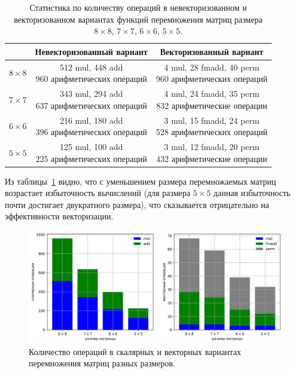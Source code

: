 \begin{table}
\centering
\singlespacing
{}\caption{Статистика по количеству операций в невекторизованном и векторизованном вариантах функций перемножения матриц размера $8 \times 8$, $7 \times 7$, $6 \times 6$, $5 \times 5$.}
\bigskip
\label{tbl:text_4_spec_matr_tabl}
\begin{tabular}{ | c | c | c | }
  \hline
  \ & Невекторизованный вариант & Векторизованный вариант \\ \hline\hline
  $8 \times 8$ & \makecell{512 mul, 448 add \\ 960 арифметических операций} & \makecell{4 mul, 28 fmadd, 40 perm \\ 960 арифметических операций} \\ \hline
  $7 \times 7$ & \makecell{343 mul, 294 add \\ 637 арифметических операций} & \makecell{4 mul, 24 fmadd, 35 perm \\ 832 арифметические операции} \\ \hline
  $6 \times 6$ & \makecell{216 mul, 180 add \\ 396 арифметических операций} & \makecell{3 mul, 15 fmadd, 24 perm \\ 528 арифметических операций} \\ \hline
  $5 \times 5$ & \makecell{125 mul, 100 add \\ 225 арифметических операций} & \makecell{3 mul, 12 fmadd, 20 perm \\ 432 арифметические операции}
 \\ \hline
\end{tabular}
\end{table}

Из таблицы~\ref{tbl:text_4_spec_matr_tabl} видно, что с уменьшением размера перемножаемых матриц возрастает избыточность вычислений (для размера $5 \times 5$ данная избыточность почти достигает двукратного размера), что сказывается отрицательно на эффективности векторизации.

\begin{figure}[ht]
\centering
\includegraphics[width=1.00\textwidth]{./fig/vec_spec_matrices_stat.png}
\singlespacing
{}\caption{Количество операций в скалярных и векторных вариантах перемножения матриц разных размеров.}
\label{fig:text_4_spec_matr_stat}
\end{figure}


